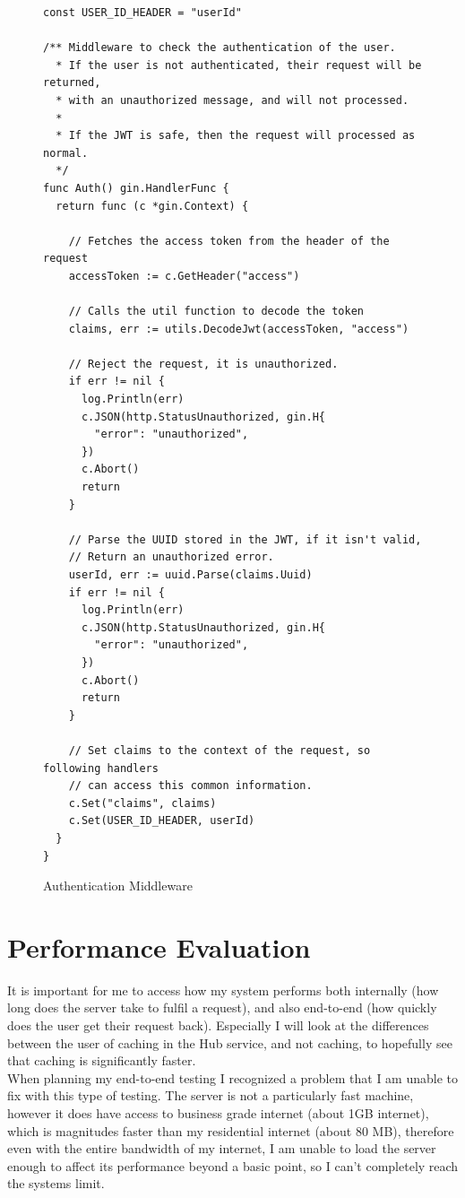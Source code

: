 \documentclass[titlepage]{article}
\begin{document}
\begin{figure}
  \begin{verbatim}
const USER_ID_HEADER = "userId"

/** Middleware to check the authentication of the user.
  * If the user is not authenticated, their request will be returned,
  * with an unauthorized message, and will not processed.
  *
  * If the JWT is safe, then the request will processed as normal.
  */
func Auth() gin.HandlerFunc {
  return func (c *gin.Context) {

    // Fetches the access token from the header of the request
    accessToken := c.GetHeader("access")

    // Calls the util function to decode the token
    claims, err := utils.DecodeJwt(accessToken, "access")

    // Reject the request, it is unauthorized.
    if err != nil {
      log.Println(err)
      c.JSON(http.StatusUnauthorized, gin.H{
        "error": "unauthorized",
      })
      c.Abort()
      return
    }

    // Parse the UUID stored in the JWT, if it isn't valid,
    // Return an unauthorized error.
    userId, err := uuid.Parse(claims.Uuid)
    if err != nil {
      log.Println(err)
      c.JSON(http.StatusUnauthorized, gin.H{
        "error": "unauthorized",
      })
      c.Abort()
      return
    }

    // Set claims to the context of the request, so following handlers
    // can access this common information.
    c.Set("claims", claims)
    c.Set(USER_ID_HEADER, userId)
  }
}
  \end{verbatim}
  \caption{Authentication Middleware}
  \label{authmiddleware}
\end{figure}

\pagebreak
\section{Performance Evaluation}
It is important for me to access how my system performs both internally (how long does the server take to fulfil a request), and also end-to-end (how quickly does the user get their request back). Especially I will look at the differences between the user of caching in the Hub service, and not caching, to hopefully see that caching is significantly faster. \\

When planning my end-to-end testing I recognized a problem that I am unable to fix with this type of testing. The server is not a particularly fast machine, however it does have access to business grade internet (about 1GB internet), which is magnitudes faster than my residential internet (about 80 MB), therefore even with the entire bandwidth of my internet, I am unable to load the server enough to affect its performance beyond a basic point, so I can't completely reach the systems limit.
\end{document}
